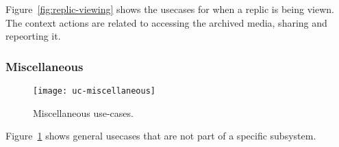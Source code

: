 Figure~\ref{fig:replic-viewing} shows the usecases for when a replic is being viewn.
The context actions are related to accessing the archived media, sharing and repeorting it.

\subsubsection{Miscellaneous}
\begin{figure}
    \centering
    \texttt{[image: uc-miscellaneous]}
    \caption{Miscellaneous use-cases.}
    \label{fig:miscellaneous}
\end{figure}

Figure~\ref{fig:miscellaneous} shows general usecases that are not part of a specific subsystem.